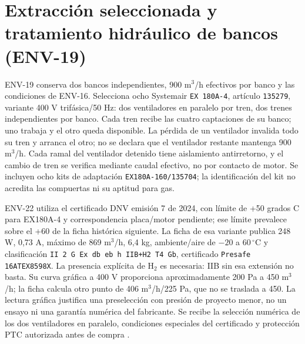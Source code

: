 \section{Extracción seleccionada y tratamiento hidráulico de bancos (ENV-19)}
\label{sec:sd4-ambiente-env19}

ENV-19 conserva dos bancos independientes, 900 m$^3$/h efectivos por banco y las condiciones de ENV-16. Selecciona ocho Systemair \texttt{EX 180A-4}, artículo \texttt{135279}, variante 400 V trifásica/50 Hz: dos ventiladores en paralelo por tren, dos trenes independientes por banco. Cada tren recibe las cuatro captaciones de su banco; uno trabaja y el otro queda disponible. La pérdida de un ventilador invalida todo su tren y arranca el otro; no se declara que el ventilador restante mantenga 900 m$^3$/h. Cada ramal del ventilador detenido tiene aislamiento antirretorno, y el cambio de tren se verifica mediante caudal efectivo, no por contacto de motor. Se incluyen ocho kits de adaptación \texttt{EX180A-160/135704}; la identificación del kit no acredita las compuertas ni su aptitud para gas.

ENV-22 utiliza el certificado DNV emisión 7 de 2024, con límite de +50 grados C para EX180A-4 y correspondencia placa/motor pendiente; ese límite prevalece sobre el +60 de la ficha histórica siguiente. La ficha de esa variante publica 248 W, 0,73 A, máximo de 869 m$^3$/h, 6,4 kg, ambiente/aire de $-20$ a 60\,$^{\circ}$C y clasificación \texttt{II 2 G Ex db eb h IIB+H2 T4 Gb}, certificado \texttt{Presafe 16ATEX8598X}. La presencia explícita de H$_2$ es necesaria: IIB sin esa extensión no basta. Su curva gráfica a 400 V proporciona aproximadamente 200 Pa a 450 m$^3$/h; la ficha calcula otro punto de 406 m$^3$/h/225 Pa, que no se traslada a 450. La lectura gráfica justifica una preselección con presión de proyecto menor, no un ensayo ni una garantía numérica del fabricante. Se recibe la selección numérica de los dos ventiladores en paralelo, condiciones especiales del certificado y protección PTC autorizada antes de compra \parencite[pp.~1--5 y 7]{lote19-systemair-ex180}.

